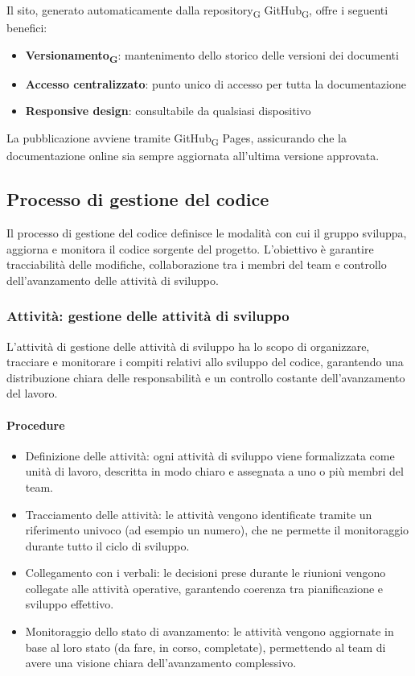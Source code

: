 \documentclass[11pt,a4paper]{article}
\newcommand{\gls}[1]{#1\textsubscript{G}}
\begin{document}
Il sito, generato automaticamente dalla \gls{repository} \gls{GitHub}, offre i seguenti benefici:
\begin{itemize}
    \item \textbf{\gls{Versionamento}}: mantenimento dello storico delle versioni dei documenti
    \item \textbf{Accesso centralizzato}: punto unico di accesso per tutta la documentazione
    \item \textbf{Responsive design}: consultabile da qualsiasi dispositivo
\end{itemize}

La pubblicazione avviene tramite \gls{GitHub} Pages, assicurando che la documentazione online sia sempre aggiornata all'ultima versione approvata.


\subsection{Processo di gestione del codice}
Il processo di gestione del codice definisce le modalità con cui il gruppo sviluppa, aggiorna e monitora il codice sorgente del progetto.
L’obiettivo è garantire tracciabilità delle modifiche, collaborazione tra i membri del team e controllo dell’avanzamento delle attività di sviluppo.

\subsubsection{Attività: gestione delle attività di sviluppo}
L’attività di gestione delle attività di sviluppo ha lo scopo di organizzare, tracciare e monitorare i compiti relativi allo sviluppo del codice, garantendo una distribuzione chiara delle responsabilità e un controllo costante dell’avanzamento del lavoro.
\paragraph{Procedure}
\begin{itemize}
\item Definizione delle attività: ogni attività di sviluppo viene formalizzata come unità di lavoro, descritta in modo chiaro e assegnata a uno o più membri del team.
\item Tracciamento delle attività: le attività vengono identificate tramite un riferimento univoco (ad esempio un numero), che ne permette il monitoraggio durante tutto il ciclo di sviluppo.
\item Collegamento con i verbali: le decisioni prese durante le riunioni vengono collegate alle attività operative, garantendo coerenza tra pianificazione e sviluppo effettivo.
\item Monitoraggio dello stato di avanzamento: le attività vengono aggiornate in base al loro stato (da fare, in corso, completate), permettendo al team di avere una visione chiara dell’avanzamento complessivo.
\end{itemize}
\end{document}
